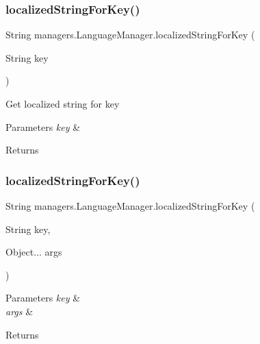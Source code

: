\subsubsection{\texorpdfstring{localized\+String\+For\+Key()}{localizedStringForKey()}\hspace{0.1cm}{\footnotesize\ttfamily [1/2]}}
{\footnotesize\ttfamily String managers.\+Language\+Manager.\+localized\+String\+For\+Key (\begin{DoxyParamCaption}\item[{String}]{key }\end{DoxyParamCaption})}

Get localized string for key 
\begin{DoxyParams}{Parameters}
{\em key} & \\
\hline
\end{DoxyParams}
\begin{DoxyReturn}{Returns}

\end{DoxyReturn}
\mbox{\label{classmanagers_1_1_language_manager_af9223db14b4e35c239123b9d0d67aee3}} 
\subsubsection{\texorpdfstring{localized\+String\+For\+Key()}{localizedStringForKey()}\hspace{0.1cm}{\footnotesize\ttfamily [2/2]}}
{\footnotesize\ttfamily String managers.\+Language\+Manager.\+localized\+String\+For\+Key (\begin{DoxyParamCaption}\item[{String}]{key,  }\item[{Object...}]{args }\end{DoxyParamCaption})}


\begin{DoxyParams}{Parameters}
{\em key} & \\
\hline
{\em args} & \\
\hline
\end{DoxyParams}
\begin{DoxyReturn}{Returns}

\end{DoxyReturn}


